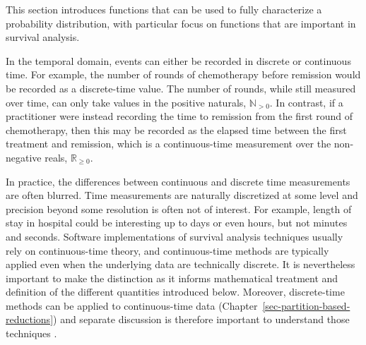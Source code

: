 \documentclass[
  letterpaper,
  krantz2]{style/krantz}
\begin{document}
This section introduces functions that can be used to fully characterize
a probability distribution, with particular focus on functions that are
important in survival analysis.

In the temporal domain, events can either be recorded in discrete or
continuous time. For example, the number of rounds of chemotherapy
before remission would be recorded as a discrete-time
value. The number of rounds,
while still measured over time, can only take values in the positive
naturals, \(\mathbb{N}_{> 0}\). In contrast, if a practitioner were
instead recording the time to remission from the first round of
chemotherapy, then this may be recorded as the elapsed time between the
first treatment and remission, which is a continuous-time measurement
over the non-negative reals, \(\mathbb{R}_{\geq 0}\).

In practice, the differences between continuous and discrete time
measurements are often blurred. Time measurements are naturally
discretized at some level and precision beyond some resolution is often
not of interest. For example, length of stay in hospital could be
interesting up to days or even hours, but not minutes and seconds.
Software implementations of survival analysis techniques usually rely on
continuous-time theory, and continuous-time methods are typically
applied even when the underlying data are technically discrete. It is
nevertheless important to make the distinction as it informs
mathematical treatment and definition of the different quantities
introduced below. Moreover, discrete-time methods can be applied to
continuous-time data (Chapter~\ref{sec-partition-based-reductions}) and
separate discussion is therefore important to understand those
techniques .
\end{document}
